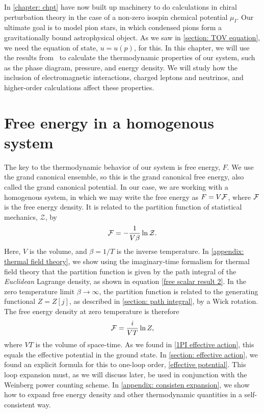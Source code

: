 In \autoref{chapter: chpt} have now built up machinery to do calculations in chiral perturbation theory in the case of a non-zero isospin chemical potential $\mu_I$.
Our ultimate goal is to model pion stars, in which condensed pions form a gravitationally bound astrophysical object.
As we saw in \autoref{section: TOV equation}, we need the equation of state, $u = u(p)$, for this.
In this chapter, we will use the results from \chpt\ to calculate the thermodynamic properties of our system, such as the phase diagram, pressure, and energy density.
We will study how the inclusion of electromagnetic interactions, charged leptons and neutrinos, and higher-order calculations affect these properties.




\section{Free energy in a homogenous system}

The key to the thermodynamic behavior of our system is free energy, $F$.
We use the grand canonical ensemble, so this is the grand canonical free energy, also called the grand canonical potential.
In our case, we are working with a homogenous system, in which we may write the free energy as $F = V\mathcal{F}$, where $\mathcal{F}$ is the free energy density.
It is related to the partition function of statistical mechanics, $\mathcal{Z}$, by
%
\begin{equation}
    \mathcal{F} = - \frac{1}{V \beta} \ln \mathcal{Z}.
\end{equation}
%
Here, $V$ is the volume, and $\beta = 1/T$ is the inverse temperature.
In \autoref{appendix: thermal field theory}, we show using the imaginary-time formalism for thermal field theory that the partition function is given by the path integral of the \emph{Euclidean} Lagrange density, as shown in equation \autoref{free scalar result 2}. 
In the zero temperature limit  $\beta \rightarrow \infty$, the partition function is related to the generating functional $Z = Z[j]$, as described in \autoref{section: path integral}, by a Wick rotation.
The free energy density at zero temperature is therefore
%
\begin{equation}
    \mathcal{F} = \frac{i}{VT} \ln Z,
\end{equation}
%
where $VT$ is the volume of space-time.
As we found in \autoref{1PI effective action}, this equals the effective potential in the ground state.
In \autoref{section: effective action}, we found an explicit formula for this to one-loop order, \autoref{effective potential}.
This loop expansion must, as we will discuss later, be used in conjunction with the Weinberg power counting scheme. 
In \autoref{appendix: consisten expansion}, we show how to expand free energy density and other thermodynamic quantities in a self-consistent way.


